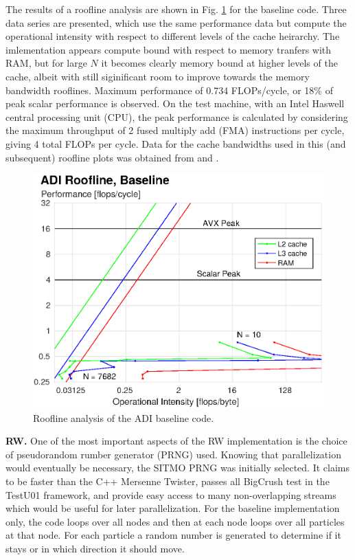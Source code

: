 \documentclass[letterpaper]{article}
\newcommand{\mypar}[1]{{\bf #1.}}
\begin{document}
The results of a roofline analysis are shown in Fig. \ref{fig:roofline_ADI_serial} for the baseline code. Three data series are presented, which use the same performance data but compute the operational intensity with respect to different levels of the cache heirarchy. The imlementation appears compute bound with respect to memory tranfers with RAM, but for large $N$ it becomes clearly memory bound at higher levels of the cache, albeit with still siginificant room to improve towards the memory bandwidth rooflines. Maximum performance of 0.734 FLOPs/cycle, or 18\% of peak scalar performance is observed. On the test machine, with an Intel Haswell central processing unit (CPU), the peak performance is calculated by considering the maximum throughput of 2 fused multiply add (FMA) instructions per cycle, giving 4 total FLOPs per cycle. Data for the cache bandwidths used in this (and subsequent) roofline plots was obtained from \cite{7_cpu} and \cite{manual_intel}.

\begin{figure}\centering
  \includegraphics[width=\linewidth]{./plots/roofline_ADI_serial.eps}
  \caption{Roofline analysis of the ADI baseline code.}
  \label{fig:roofline_ADI_serial}
\end{figure}

\mypar{RW}
One of the most important aspects of the RW implementation is the choice of pseudorandom rumber generator (PRNG) used. Knowing that parallelization would eventually be necessary, the SITMO PRNG \cite{sitmo} was initially selected. It claims to be faster than the C++ Mersenne Twister, passes all BigCrush test in the TestU01 framework, and provide easy access to many non-overlapping streams which would be useful for later parallelization. For the baseline implementation only, the code loops over all nodes and then at each node loops over all particles at that node. For each particle a random number is generated to determine if it stays or in which direction it should move.
\end{document}
